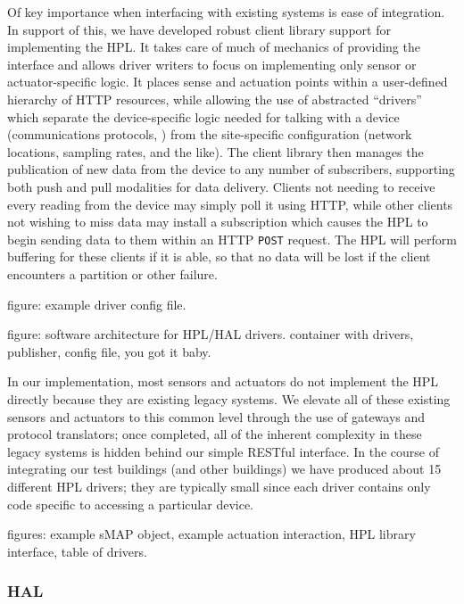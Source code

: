 Of key importance when interfacing with existing systems is ease of integration.  In support of this, we have developed robust client library support for implementing the HPL.  It takes care of much of mechanics of providing the interface and allows driver writers to focus on implementing only sensor or actuator-specific logic.  It places sense and actuation points within a user-defined hierarchy of HTTP resources, while allowing the use of abstracted ``drivers'' which separate the device-specific logic needed for talking with a device (communications protocols, \etc) from the site-specific configuration (network locations, sampling rates, and the like).  The client library then manages the publication of new data from the device to any number of subscribers, supporting both push and pull modalities for data delivery.  Clients not needing to receive every reading from the device may simply poll it using HTTP, while other clients not wishing to miss data may install a subscription which causes the HPL to begin sending data to them within an HTTP {\tt POST} request.  The HPL will perform buffering for these clients if it is able, so that no data will be lost if the client encounters a partition or other failure.

figure: example driver config file.

figure: software architecture for HPL/HAL drivers.  container with drivers, publisher, config file, you got it baby.

In our implementation, most sensors and actuators do not implement the HPL directly because they are existing legacy systems.  We elevate all of these existing sensors and actuators to this common level through the use of gateways and protocol translators; once completed, all of the inherent complexity in these legacy systems is hidden behind our simple RESTful interface.  In the course of integrating our test buildings (and other buildings) we have produced about 15 different HPL drivers; they are typically small since each driver contains only code specific to accessing a particular device.

figures: example sMAP object, example actuation interaction, HPL library interface, table of drivers.

\subsubsection{HAL}

